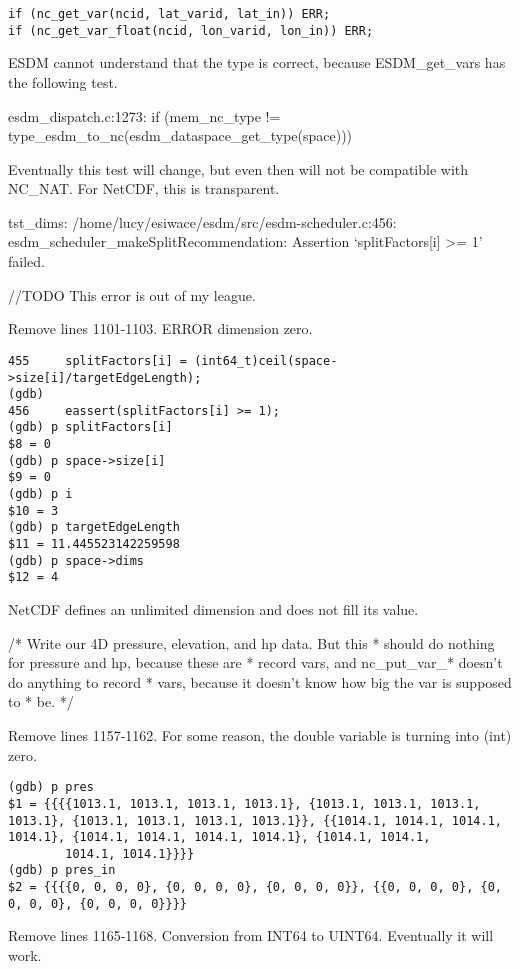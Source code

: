 \begin{verbatim}
if (nc_get_var(ncid, lat_varid, lat_in)) ERR;
if (nc_get_var_float(ncid, lon_varid, lon_in)) ERR;
\end{verbatim}

ESDM cannot understand that the type is correct, because ESDM\_get\_vars has the following test.

esdm\_dispatch.c:1273: if (mem\_nc\_type != type\_esdm\_to\_nc(esdm\_dataspace\_get\_type(space)))

Eventually this test will change, but even then will not be compatible with NC\_NAT. For NetCDF, this is transparent.

tst\_dims: /home/lucy/esiwace/esdm/src/esdm-scheduler.c:456: esdm\_scheduler\_makeSplitRecommendation: Assertion `splitFactors[i] >= 1' failed.

//TODO This error is out of my league.

Remove lines 1101-1103. ERROR dimension zero.

\begin{verbatim}
455	    splitFactors[i] = (int64_t)ceil(space->size[i]/targetEdgeLength);
(gdb)
456	    eassert(splitFactors[i] >= 1);
(gdb) p splitFactors[i]
$8 = 0
(gdb) p space->size[i]
$9 = 0
(gdb) p i
$10 = 3
(gdb) p targetEdgeLength
$11 = 11.445523142259598
(gdb) p space->dims
$12 = 4
\end{verbatim}

NetCDF defines an unlimited dimension and does not fill its value.

/* Write our 4D pressure, elevation, and hp data. But this
 * should do nothing for pressure and hp, because these are
 * record vars, and nc\_put\_var\_* doesn't do anything to record
 * vars, because it doesn't know how big the var is supposed to
 * be. */

Remove lines 1157-1162. For some reason, the double variable is turning into (int) zero.

\begin{verbatim}
(gdb) p pres
$1 = {{{{1013.1, 1013.1, 1013.1, 1013.1}, {1013.1, 1013.1, 1013.1, 1013.1}, {1013.1, 1013.1, 1013.1, 1013.1}}, {{1014.1, 1014.1, 1014.1, 1014.1}, {1014.1, 1014.1, 1014.1, 1014.1}, {1014.1, 1014.1,
        1014.1, 1014.1}}}}
(gdb) p pres_in
$2 = {{{{0, 0, 0, 0}, {0, 0, 0, 0}, {0, 0, 0, 0}}, {{0, 0, 0, 0}, {0, 0, 0, 0}, {0, 0, 0, 0}}}}
\end{verbatim}

Remove lines 1165-1168. Conversion from INT64 to UINT64. Eventually it will work.

